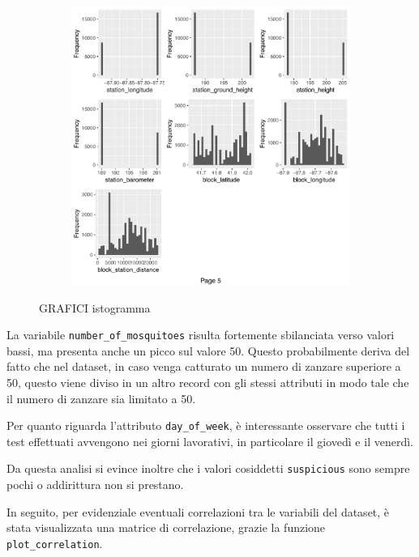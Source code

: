 \begin{figure}[H]
	\ContinuedFloat 
	\begin{subfigure}[t]{0.49\textwidth}
		\includegraphics[width=\textwidth]{images/ml/plot_histogram5}
	\end{subfigure}
\caption{GRAFICI istogramma}
\label{fig:plot_histogram}
\end{figure}

La variabile \texttt{number\_of\_mosquitoes} risulta fortemente sbilanciata 
verso valori bassi, ma presenta anche un picco sul valore 50. Questo 
probabilmente deriva del fatto che nel dataset, in caso venga catturato un 
numero di zanzare superiore a 50, questo viene diviso in un altro record con 
gli stessi attributi in modo tale che il numero di zanzare sia limitato a 50.  

Per quanto riguarda l'attributo \texttt{day\_of\_week}, è interessante 
osservare che tutti i test effettuati avvengono nei giorni lavorativi, in 
particolare il giovedì e il venerdì. 


Da questa analisi si evince inoltre che i valori cosiddetti 
 \texttt{suspicious} sono sempre pochi o addirittura non si prestano.

In seguito, per evidenziale eventuali correlazioni tra le variabili del 
dataset, è stata visualizzata una matrice di correlazione, grazie la funzione 
\texttt{plot\_correlation}.

